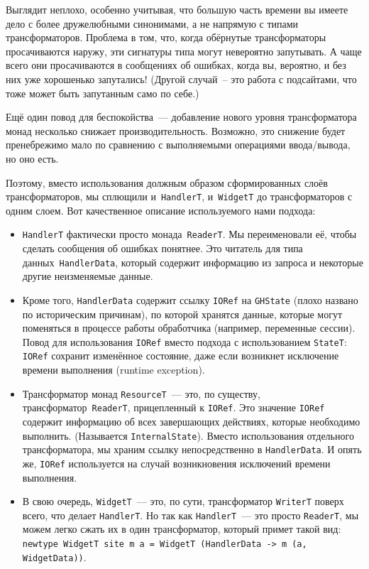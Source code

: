 Выглядит неплохо, особенно учитывая, что большую часть времени вы имеете дело с
более дружелюбными синонимами, а не напрямую с типами трансформаторов. Проблема
в том, что, когда обёрнутые трансформаторы просачиваются наружу,
эти сигнатуры типа могут невероятно запутывать. А чаще всего они просачиваются
в сообщениях об ошибках, когда вы, вероятно, и без них уже хорошенько
запутались! (Другой случай~-- это работа с подсайтами, что тоже может быть
запутанным само по себе.)

Ещё один повод для беспокойства~--- добавление нового уровня трансформатора монад
несколько снижает производительность. Возможно, это снижение будет пренебрежимо
мало по сравнению с выполняемыми операциями ввода/вывода, но оно есть.

Поэтому, вместо использования должным образом сформированных слоёв
трансформаторов, мы сплющили и~\lstinline'HandlerT', и~\lstinline'WidgetT' до
трансформаторов с одним слоем.  Вот качественное описание используемого нами
подхода:
\begin{itemize}
    \item \lstinline'HandlerT' фактически просто монада~\lstinline'ReaderT'. Мы
        переименовали её, чтобы сделать сообщения об ошибках понятнее. Это
        читатель для типа данных~\lstinline'HandlerData', который содержит
        информацию из запроса и некоторые другие неизменяемые данные.

    \item Кроме того, \lstinline'HandlerData' содержит ссылку \lstinline'IORef'
        на \lstinline'GHState' (плохо названо по историческим причинам), по
        которой хранятся данные, которые могут поменяться в процессе работы
        обработчика (например, переменные сессии). Повод для использования
        \lstinline'IORef' вместо подхода с использованием \lstinline'StateT':
        \lstinline'IORef' сохранит изменённое состояние, даже если возникнет
        исключение времени выполнения (runtime exception).

    \item Трансформатор монад \lstinline'ResourceT'~--- это, по существу,
        трансформатор~\lstinline'ReaderT', прицепленный к \lstinline'IORef'. Это
        значение \lstinline'IORef' содержит информацию об всех завершающих
        действиях, которые необходимо выполнить. (Называется
        \lstinline'InternalState'). Вместо использования отдельного
        трансформатора, мы храним ссылку непосредственно в
        \lstinline'HandlerData'. И опять же, \lstinline'IORef' используется на
        случай возникновения исключений времени выполнения.

    \item В свою очередь, \lstinline'WidgetT'~--- это, по сути, трансформатор
        \lstinline'WriterT' поверх всего, что делает \lstinline'HandlerT'. Но
        так как \lstinline'HandlerT'~--- это просто \lstinline'ReaderT', мы
        можем легко сжать их в один трансформатор, который примет такой вид:
        \lstinline'newtype WidgetT site m a = WidgetT (HandlerData -> m (a, WidgetData))'.
\end{itemize}

